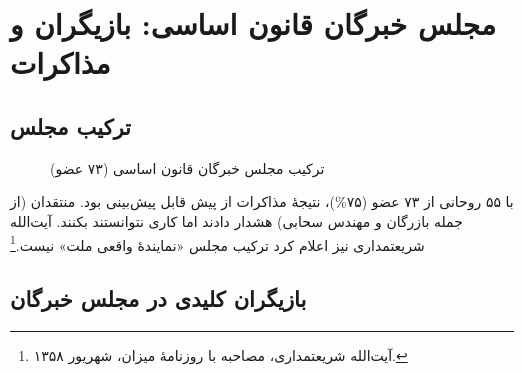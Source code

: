 \documentclass[12pt,a4paper]{book}
\begin{document}
\section{مجلس خبرگان قانون اساسی: بازیگران و مذاکرات}

\subsection{ترکیب مجلس}

\begin{figure}[H]
\centering
{}
\caption{ترکیب مجلس خبرگان قانون اساسی (۷۳ عضو)}
\label{fig:experts-composition}
\end{figure}

\begin{warningBox}
با ۵۵ روحانی از ۷۳ عضو (۷۵\%)، نتیجهٔ مذاکرات از پیش قابل پیش‌بینی بود. منتقدان (از جمله بازرگان و مهندس سحابی) هشدار دادند اما کاری نتوانستند بکنند. آیت‌الله شریعتمداری نیز اعلام کرد ترکیب مجلس «نمایندهٔ واقعی ملت» نیست.\footnote{آیت‌الله شریعتمداری، مصاحبه با روزنامهٔ میزان، شهریور ۱۳۵۸.}
\end{warningBox}

\subsection{بازیگران کلیدی در مجلس خبرگان}
\end{document}
